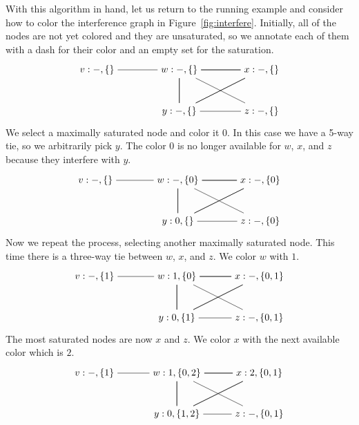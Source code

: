 \documentclass[12pt]{book}
\begin{document}
With this algorithm in hand, let us return to the running example and
consider how to color the interference graph in
Figure~\ref{fig:interfere}. Initially, all of the nodes are not yet
colored and they are unsaturated, so we annotate each of them with a
dash for their color and an empty set for the saturation.
\[
\begin{tikzpicture}[baseline=(current  bounding  box.center)]
\node (v) at (0,0)    {$v:-,\{\}$};
\node (w) at (3,0)    {$w:-,\{\}$};
\node (x) at (6,0)    {$x:-,\{\}$};
\node (y) at (3,-1.5) {$y:-,\{\}$};
\node (z) at (6,-1.5) {$z:-,\{\}$};
\draw (v) to (w);
\foreach \i in {w,x,y} 
{
  \foreach \j in {w,x,y}
  { 
    \draw (\i) to (\j);
  }
}
\draw (z) to (w);
\draw (z) to (y);
\end{tikzpicture}
\]
We select a maximally saturated node and color it $0$. In this case we
have a 5-way tie, so we arbitrarily pick $y$. The color $0$ is no
longer available for $w$, $x$, and $z$ because they interfere with
$y$.
\[
\begin{tikzpicture}[baseline=(current  bounding  box.center)]
\node (v) at (0,0)    {$v:-,\{\}$};
\node (w) at (3,0)    {$w:-,\{0\}$};
\node (x) at (6,0)    {$x:-,\{0\}$};
\node (y) at (3,-1.5) {$y:0,\{\}$};
\node (z) at (6,-1.5) {$z:-,\{0\}$};
\draw (v) to (w);
\foreach \i in {w,x,y} 
{
  \foreach \j in {w,x,y}
  { 
    \draw (\i) to (\j);
  }
}
\draw (z) to (w);
\draw (z) to (y);
\end{tikzpicture}
\]
Now we repeat the process, selecting another maximally saturated node.
This time there is a three-way tie between $w$, $x$, and $z$. We color
$w$ with $1$.
\[
\begin{tikzpicture}[baseline=(current  bounding  box.center)]
\node (v) at (0,0)    {$v:-,\{1\}$};
\node (w) at (3,0)    {$w:1,\{0\}$};
\node (x) at (6,0)    {$x:-,\{0,1\}$};
\node (y) at (3,-1.5) {$y:0,\{1\}$};
\node (z) at (6,-1.5) {$z:-,\{0,1\}$};
\draw (v) to (w);
\foreach \i in {w,x,y} 
{
  \foreach \j in {w,x,y}
  { 
    \draw (\i) to (\j);
  }
}
\draw (z) to (w);
\draw (z) to (y);
\end{tikzpicture}
\]
The most saturated nodes are now $x$ and $z$. We color $x$ with the
next available color which is $2$.
\[
\begin{tikzpicture}[baseline=(current  bounding  box.center)]
\node (v) at (0,0)    {$v:-,\{1\}$};
\node (w) at (3,0)    {$w:1,\{0,2\}$};
\node (x) at (6,0)    {$x:2,\{0,1\}$};
\node (y) at (3,-1.5) {$y:0,\{1,2\}$};
\node (z) at (6,-1.5) {$z:-,\{0,1\}$};
\draw (v) to (w);
\foreach \i in {w,x,y} 
{
  \foreach \j in {w,x,y}
  { 
    \draw (\i) to (\j);
  }
}
\draw (z) to (w);
\draw (z) to (y);
\end{tikzpicture}
\]
\end{document}
